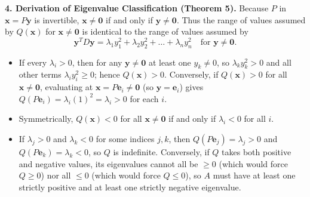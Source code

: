 \documentclass[11pt, letterpaper]{article}
\theoremstyle{definition}
\theoremstyle{remark}
\begin{document}
\begin{center}
\end{center}

\textbf{4. Derivation of Eigenvalue Classification (Theorem 5).}
Because $P$ in $\mathbf{x} = P\mathbf{y}$ is invertible, $\mathbf{x} \neq \mathbf{0}$ if and only if $\mathbf{y} \neq \mathbf{0}$. Thus the range of values assumed by $Q(\mathbf{x})$ for $\mathbf{x} \neq \mathbf{0}$ is identical to the range of values assumed by
\[
\mathbf{y}^T D \mathbf{y} = \lambda_1 y_1^2 + \lambda_2 y_2^2 + \dots + \lambda_n y_n^2 \quad \text{for } \mathbf{y} \neq \mathbf{0}.
\]
\begin{itemize}
    \item If every $\lambda_i > 0$, then for any $\mathbf{y} \neq \mathbf{0}$ at least one $y_k \neq 0$, so $\lambda_k y_k^2 > 0$ and all other terms $\lambda_i y_i^2 \ge 0$; hence $Q(\mathbf{x}) > 0$. Conversely, if $Q(\mathbf{x}) > 0$ for all $\mathbf{x} \neq \mathbf{0}$, evaluating at $\mathbf{x} = P\mathbf{e}_i \neq \mathbf{0}$ (so $\mathbf{y} = \mathbf{e}_i$) gives $Q(P\mathbf{e}_i) = \lambda_i (1)^2 = \lambda_i > 0$ for each $i$.
    \item Symmetrically, $Q(\mathbf{x}) < 0$ for all $\mathbf{x} \neq \mathbf{0}$ if and only if $\lambda_i < 0$ for all $i$.
    \item If $\lambda_j > 0$ and $\lambda_k < 0$ for some indices $j, k$, then $Q(P\mathbf{e}_j) = \lambda_j > 0$ and $Q(P\mathbf{e}_k) = \lambda_k < 0$, so $Q$ is indefinite. Conversely, if $Q$ takes both positive and negative values, its eigenvalues cannot all be $\ge 0$ (which would force $Q \ge 0$) nor all $\le 0$ (which would force $Q \le 0$), so $A$ must have at least one strictly positive and at least one strictly negative eigenvalue.
\end{itemize}
\end{document}
